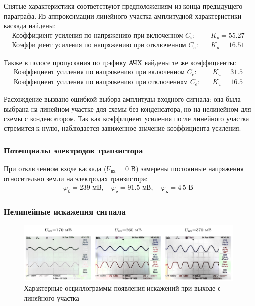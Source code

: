 Снятые характеристики соответствуют предположениям из конца предыдущего параграфа. Из аппроксимации линейного участка амплитудной характеристики каскада найдены:
\begin{equation*}
	\begin{aligned}
		\text{Коэффициент усиления по напряжению при включенном $C_e$:}&\quad K_u=55.27\\
		\text{Коэффициент усиления по напряжению при отключенном $C_e$:}&\quad K_u=16.51
	\end{aligned}
\end{equation*}

Также в полосе пропускания по графику АЧХ найдены те же коэффициенты:
\begin{equation*}
	\begin{aligned}
		\text{Коэффициент усиления по напряжению при включенном $C_e$:}&\quad K_u=31.5\\
		\text{Коэффициент усиления по напряжению при отключенном $C_e$:}&\quad K_u=16.5
	\end{aligned}
\end{equation*}

Расхождение вызвано ошибкой выбора амплитуды входного сигнала: она была выбрана на линейном участке для схемы без конденсатора, но на нелинейном для схемы с конденсатором. Так как коэффициент усиления после линейного участка стремится к нулю, наблюдается заниженное значение коэффициента усиления.

\subsubsection{Потенциалы электродов транзистора}

При отключенном входе каскада ($U_{\text{вх}}=0$ В) замерены постоянные напряжения относительно земли на электродах транзистора:
\begin{gather*}
		\varphi_\text{б}=239 \text{ мВ}, \quad
		\varphi_\text{э}=91.5 \text{ мВ}, \quad
		\varphi_\text{к}=4.5 \text{ В}
\end{gather*}

\subsubsection{Нелинейные искажения сигнала}

\begin{figure}[H]
	\centering
	\includegraphics[width=\textwidth]{ris/dist}
	\caption{Характерные осциллограммы появления искажений при выходе с линейного участка}
	\label{fig:nonlin_oscii}
\end{figure}


